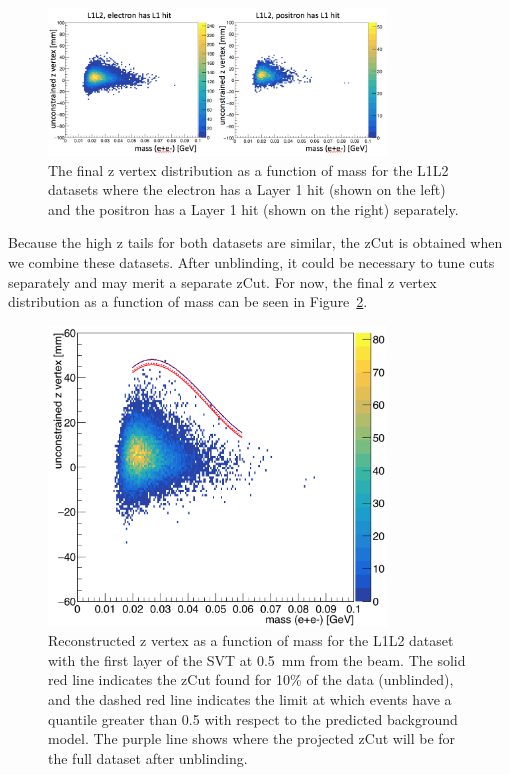 \begin{figure}[H]
  \centering
     \includegraphics[width=0.8\textwidth]{plots/L1L2_datasets.png}
  \caption{The final z vertex distribution as a function of mass for the L1L2 datasets where the electron has a Layer 1 hit (shown on the left) and the positron has a Layer 1 hit (shown on the right) separately.}
  \label{fig:L1L2_datasets}
\end{figure} 

Because the high z tails for both datasets are similar, the zCut is obtained when we combine these datasets. After unblinding, it could be necessary to tune cuts separately and may merit a separate zCut. For now, the final z vertex distribution as a function of mass can be seen in Figure~\ref{fig:zVm_L1L2}.

\begin{figure}[H]
  \centering
     \includegraphics[width=0.8\textwidth]{plots/zVm_L1L2_0p5.png}
  \caption{Reconstructed z vertex as a function of mass for the L1L2 dataset with the first layer of the SVT at 0.5~mm from the beam. The solid red line indicates the zCut found for 10$\%$ of the data (unblinded), and the dashed red line indicates the limit at which events have a quantile greater than 0.5 with respect to the predicted background model. The purple line shows where the projected zCut will be for the full dataset after unblinding.}
  \label{fig:zVm_L1L2}
\end{figure} 

